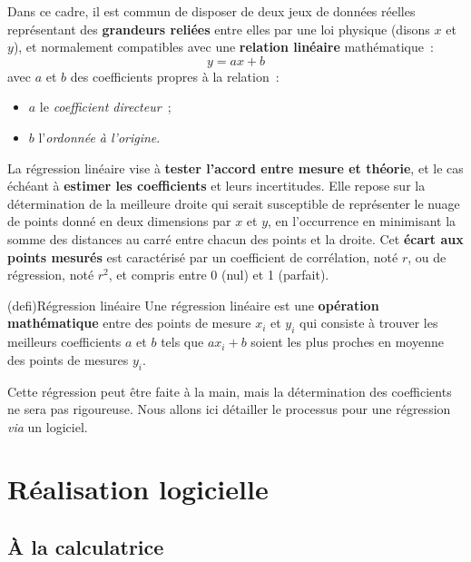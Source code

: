 \documentclass[a4paper, 12pt, garamond]{book}
\begin{document}
Dans ce cadre, il est commun de disposer de deux jeux de données réelles
représentant des \textbf{grandeurs reliées} entre elles par une
loi physique (disons $x$ et $y$), et normalement compatibles avec une
\textbf{relation linéaire} mathématique~:
\[
	\boxed{y = ax+b}
\]
avec $a$ et $b$ des coefficients propres à la relation~:
\begin{itemize}
	\item $a$ le \textit{coefficient directeur}~;
	\item $b$ l'\textit{ordonnée à l'origine}.
\end{itemize}

La régression linéaire vise à \textbf{tester l'accord entre mesure et
	théorie}, et le cas échéant à \textbf{estimer les coefficients} et leurs
incertitudes. Elle repose sur la détermination de la meilleure droite qui serait
susceptible de représenter le nuage de points donné en deux dimensions par $x$
et $y$, en l'occurrence en minimisant la somme des distances au carré entre
chacun des points et la droite. Cet \textbf{écart aux points mesurés} est
caractérisé par un coefficient de corrélation, noté $r$, ou de régression, noté
$r^{2}$, et compris entre 0 (nul) et 1 (parfait).

\begin{tcb}(defi){Régression linéaire}
	Une régression linéaire est une \textbf{opération mathématique} entre des
	points de mesure $x_i$ et $y_i$ qui consiste à trouver les meilleurs
	coefficients $a$ et $b$ tels que $ax_i+b$ soient les plus proches en moyenne
	des points de mesures $y_i$.
\end{tcb}

Cette régression peut être faite à la main, mais la détermination des
coefficients ne sera pas rigoureuse. Nous allons ici détailler le processus pour
une régression \textit{via} un logiciel.

\section{Réalisation logicielle}

\subsection{À la calculatrice}
\end{document}
